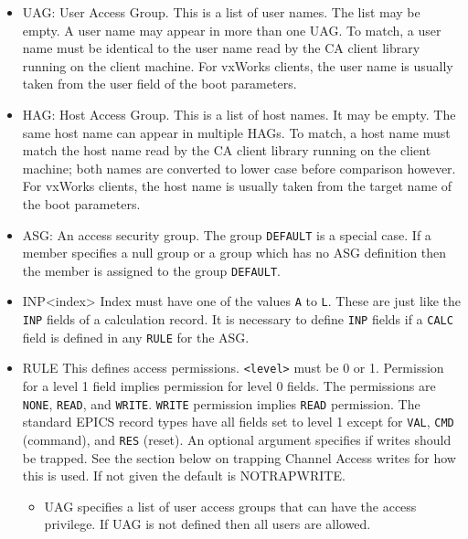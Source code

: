 \begin{itemize}
\item {}UAG: User Access Group.
This is a list of user names.
The list may be empty.
A user name may appear in more than one UAG.
To match, a user name must be identical to the user name read by the CA client library running on the client machine.
For vxWorks clients, the user name is usually taken from the user field of the boot parameters.

\item {}HAG: Host Access Group.
This is a list of host names.
It may be empty.
The same host name can appear in multiple HAGs.
To match, a host name must match the host name read by the CA client library running on the client machine; both names are converted to lower case before comparison however.
For vxWorks clients, the host name is usually taken from the target name of the boot parameters.

\item {}ASG: An access security group. The group \verb|DEFAULT| is a special case. If a member specifies a null group or a 
group which has no ASG definition then the member is assigned to the group \verb|DEFAULT|.

\item {}INP\textless{}index\textgreater{}  Index must have one of the values \verb|A| to \verb|L|. These are just like the \verb|INP| fields of a 
calculation record. It is necessary to define \verb|INP| fields if a \verb|CALC| field is defined in any \verb|RULE| for the ASG.

\item {}RULE   This defines access permissions.
\verb|<level>| must be 0 or 1. Permission for a level 1 field implies 
permission for level 0 fields. The permissions are \verb|NONE|, \verb|READ|, and \verb|WRITE|. \verb|WRITE| permission implies 
\verb|READ| permission. The standard EPICS record types have all fields set to level 1 except for \verb|VAL|, \verb|CMD| 
(command), and \verb|RES| (reset). An optional argument specifies if writes should be trapped. See the section 
below on trapping Channel Access writes for how this is used. If not given the default is NOTRAPWRITE.

\begin{itemize}

\item {}UAG specifies a list of user access groups that can have the access privilege. If UAG is not defined 
then all users are allowed.


\end{itemize}
\end{itemize}

